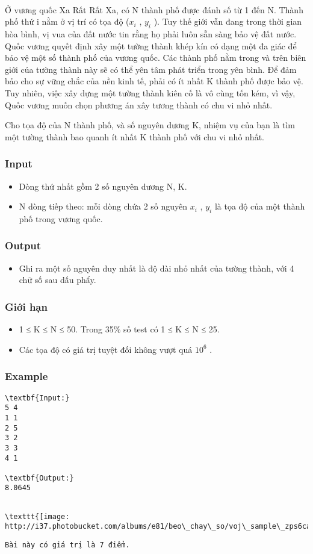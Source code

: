 

 

Ở vương quốc Xa Rất Rất Xa, có N thành phố được đánh số từ 1 đến N. Thành phố thứ i nằm ở vị trí có tọa độ ($x_{i}$ , $y_{i}$ ). Tuy thế giới vẫn đang trong thời gian hòa bình, vị vua của đất nước tin rằng họ phải luôn sẵn sàng bảo vệ đất nước. Quốc vương quyết định xây một tường thành khép kín có dạng một đa giác để bảo vệ một số thành phố của vương quốc. Các thành phố nằm trong và trên biên giới của tường thành này sẽ có thể yên tâm phát triển trong yên bình. Để đảm bảo cho sự vững chắc của nền kinh tế, phải có ít nhất K thành phố được bảo vệ. Tuy nhiên, việc xây dựng một tường thành kiên cố là vô cùng tốn kém, vì vậy, Quốc vương muốn chọn phương án xây tương thành có chu vi nhỏ nhất.

Cho tọa độ của N thành phố, và số nguyên dương K, nhiệm vụ của bạn là tìm một tường thành bao quanh ít nhất K thành phố với chu vi nhỏ nhất.

\subsubsection{Input}
\begin{itemize}
	\item Dòng thứ nhất gồm 2 số nguyên dương N, K.
	\item N dòng tiếp theo: mỗi dòng chứa 2 số nguyên $x_{i}$ , $y_{i}$ là tọa độ của một thành phố trong vương quốc.
\end{itemize}

\subsubsection{Output}
\begin{itemize}
	\item Ghi ra một số nguyên duy nhất là độ dài nhỏ nhất của tường thành, với 4 chữ số sau dấu phẩy.
\end{itemize}

\subsubsection{Giới hạn}
\begin{itemize}
	\item 1 ≤ K ≤ N ≤ 50. Trong 35\% số test có 1 ≤ K ≤ N ≤ 25.
	\item Các tọa độ có giá trị tuyệt đối không vượt quá $10^{6}$ .
\end{itemize}

\subsubsection{Example}
\begin{verbatim}
\textbf{Input:}
5 4
1 1
2 5
3 2
3 3
4 1

\textbf{Output:}
8.0645
\end{verbatim}
\begin{verbatim}

\texttt{[image: http://i37.photobucket.com/albums/e81/beo\_chay\_so/voj\_sample\_zps6cadef14.png]}\end{verbatim}
\begin{verbatim}
Bài này có giá trị là 7 điểm.\end{verbatim}
